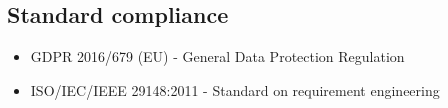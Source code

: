 \documentclass[../../../rasd.tex]{subfiles}
\begin{document}
\subsection{Standard compliance\label{sect:3.4.1}}
\begin{itemize}
	\item GDPR 2016/679 (EU) - General Data Protection Regulation
	\item ISO/IEC/IEEE 29148:2011 - Standard on requirement engineering
\end{itemize}
\end{document}
